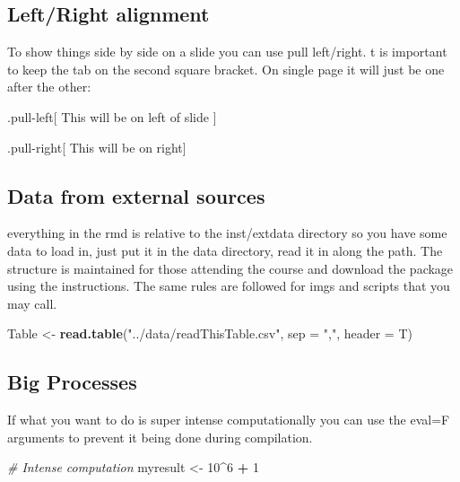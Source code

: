 \documentclass[
]{article}
\newenvironment{Shaded}{\begin{snugshade}}{\end{snugshade}}
\newcommand{\CommentTok}[1]{\textcolor[rgb]{0.56,0.35,0.01}{\textit{#1}}}
\newcommand{\DataTypeTok}[1]{\textcolor[rgb]{0.13,0.29,0.53}{#1}}
\newcommand{\DecValTok}[1]{\textcolor[rgb]{0.00,0.00,0.81}{#1}}
\newcommand{\KeywordTok}[1]{\textcolor[rgb]{0.13,0.29,0.53}{\textbf{#1}}}
\newcommand{\NormalTok}[1]{#1}
\newcommand{\OperatorTok}[1]{\textcolor[rgb]{0.81,0.36,0.00}{\textbf{#1}}}
\newcommand{\StringTok}[1]{\textcolor[rgb]{0.31,0.60,0.02}{#1}}
\begin{document}
\hypertarget{leftright-alignment}{%
\subsection{Left/Right alignment}\label{leftright-alignment}}

To show things side by side on a slide you can use pull left/right. t is
important to keep the tab on the second square bracket. On single page
it will just be one after the other:

.pull-left{[} This will be on left of slide {]}

.pull-right{[} This will be on right{]}

\hypertarget{data-from-external-sources}{%
\subsection{Data from external
sources}\label{data-from-external-sources}}

everything in the rmd is relative to the inst/extdata directory so you
have some data to load in, just put it in the data directory, read it in
along the path. The structure is maintained for those attending the
course and download the package using the instructions. The same rules
are followed for imgs and scripts that you may call.

\begin{Shaded}
\begin{Highlighting}[]
\NormalTok{Table <-}\StringTok{ }\KeywordTok{read.table}\NormalTok{(}\StringTok{"../data/readThisTable.csv"}\NormalTok{, }\DataTypeTok{sep =} \StringTok{","}\NormalTok{, }\DataTypeTok{header =}\NormalTok{ T)}
\end{Highlighting}
\end{Shaded}

\hypertarget{big-processes}{%
\subsection{Big Processes}\label{big-processes}}

If what you want to do is super intense computationally you can use the
eval=F arguments to prevent it being done during compilation.

\begin{Shaded}
\begin{Highlighting}[]
\CommentTok{# Intense computation}
\NormalTok{myresult <-}\StringTok{ }\DecValTok{10}\OperatorTok{^}\DecValTok{6} \OperatorTok{+}\StringTok{ }\DecValTok{1}
\end{Highlighting}
\end{Shaded}
\end{document}
